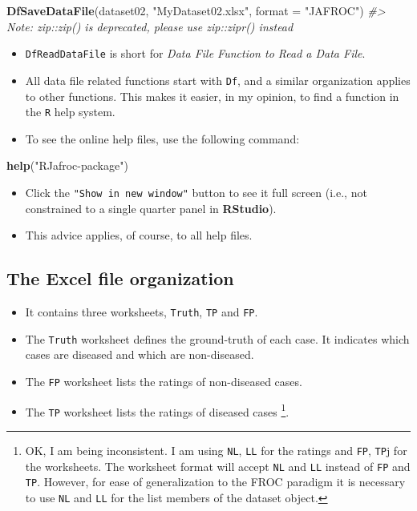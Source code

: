 \documentclass[]{book}
\newenvironment{Shaded}{\begin{snugshade}}{\end{snugshade}}
\newcommand{\CommentTok}[1]{\textcolor[rgb]{0.56,0.35,0.01}{\textit{#1}}}
\newcommand{\DataTypeTok}[1]{\textcolor[rgb]{0.13,0.29,0.53}{#1}}
\newcommand{\KeywordTok}[1]{\textcolor[rgb]{0.13,0.29,0.53}{\textbf{#1}}}
\newcommand{\NormalTok}[1]{#1}
\newcommand{\StringTok}[1]{\textcolor[rgb]{0.31,0.60,0.02}{#1}}
\providecommand{\tightlist}{%
  \setlength{\itemsep}{0pt}\setlength{\parskip}{0pt}}
\let\rmarkdownfootnote\footnote%
\def\footnote{\protect\rmarkdownfootnote}
\begin{document}
\begin{Shaded}
\begin{Highlighting}[]
\KeywordTok{DfSaveDataFile}\NormalTok{(dataset02, }\StringTok{"MyDataset02.xlsx"}\NormalTok{, }\DataTypeTok{format =} \StringTok{"JAFROC"}\NormalTok{)}
\CommentTok{#> Note: zip::zip() is deprecated, please use zip::zipr() instead}
\end{Highlighting}
\end{Shaded}

\begin{itemize}
\tightlist
\item
  \texttt{DfReadDataFile} is short for \emph{Data File Function to Read a Data File}.
\item
  All data file related functions start with \texttt{Df}, and a similar organization applies to other functions. This makes it easier, in my opinion, to find a function in the \texttt{R} help system.
\item
  To see the online help files, use the following command:
\end{itemize}

\begin{Shaded}
\begin{Highlighting}[]
\KeywordTok{help}\NormalTok{(}\StringTok{"RJafroc-package"}\NormalTok{)}
\end{Highlighting}
\end{Shaded}

\begin{itemize}
\tightlist
\item
  Click the \texttt{"Show\ in\ new\ window"} button to see it full screen (i.e., not constrained to a single quarter panel in \textbf{RStudio}).
\item
  This advice applies, of course, to all help files.
\end{itemize}

\hypertarget{the-excel-file-organization}{%
\subsection{The Excel file organization}\label{the-excel-file-organization}}

\begin{itemize}
\tightlist
\item
  It contains three worksheets, \texttt{Truth}, \texttt{TP} and \texttt{FP}.
\item
  The \texttt{Truth} worksheet defines the ground-truth of each case. It indicates which cases are diseased and which are non-diseased.
\item
  The \texttt{FP} worksheet lists the ratings of non-diseased cases.
\item
  The \texttt{TP} worksheet lists the ratings of diseased cases \footnote{OK, I am being inconsistent. I am using \texttt{NL}, \texttt{LL} for the ratings and \texttt{FP}, \texttt{TP}j for the worksheets. The worksheet format will accept \texttt{NL} and \texttt{LL} instead of \texttt{FP} and \texttt{TP}. However, for ease of generalization to the FROC paradigm it is necessary to use \texttt{NL} and \texttt{LL} for the list members of the dataset object.}.
\end{itemize}
\end{document}
